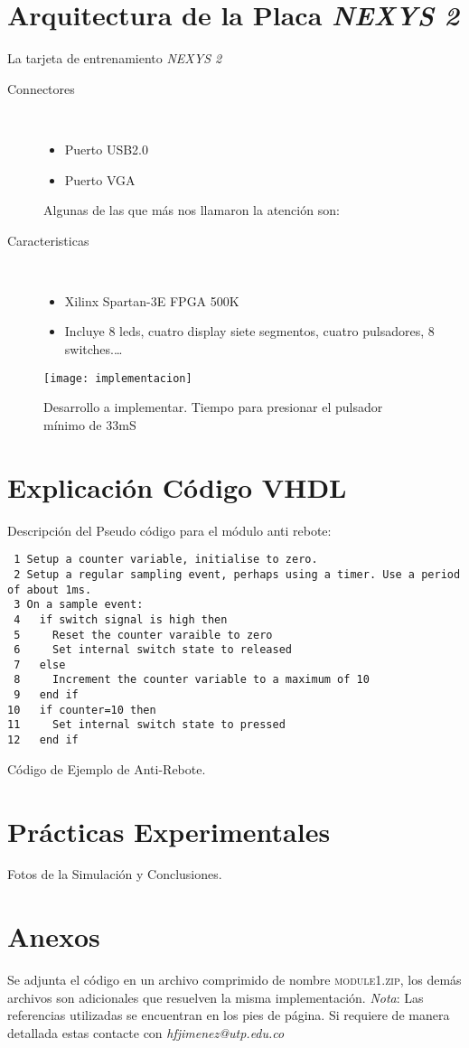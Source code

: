 \documentclass[paper=a4, fontsize=12pt]{article} 		%
\numberwithin{equation}{section}						%
\numberwithin{table}{section} 							%
\begin{document}
\section{Arquitectura de la Placa \emph{NEXYS 2}}
La tarjeta de entrenamiento \emph{NEXYS 2} 
\begin{description}
  \item[Connectores] \hfill \\
  	\begin{itemize}
		\item Puerto USB2.0
	    \item Puerto VGA
    \end{itemize}

Algunas de las que más nos llamaron la atención son:\\
  \item[Caracteristicas] \hfill \\
    	\begin{itemize}
			\item Xilinx Spartan-3E FPGA 500K
  			\item Incluye  8 leds, cuatro display siete segmentos, cuatro pulsadores, 8 switches.\ldots
      \end{itemize}
\end{description}
\begin{figure}[H]
  \centering
     \texttt{[image: implementacion]}
  \caption{Desarrollo a implementar. Tiempo para presionar el pulsador mínimo de 33mS}
  \label{fig:eliteimplemetacion}
\end{figure}
\section{Explicación Código VHDL}
Descripción del Pseudo código para el módulo anti rebote:
\begin{verbatim}
 1 Setup a counter variable, initialise to zero.
 2 Setup a regular sampling event, perhaps using a timer. Use a period of about 1ms.
 3 On a sample event:
 4   if switch signal is high then
 5     Reset the counter varaible to zero
 6     Set internal switch state to released
 7   else
 8     Increment the counter variable to a maximum of 10
 9   end if
10   if counter=10 then
11     Set internal switch state to pressed
12   end if
\end{verbatim}
Código de Ejemplo de Anti-Rebote.
\section{Prácticas Experimentales}
Fotos de la Simulación y Conclusiones.
\section{Anexos}
Se adjunta el código en un archivo comprimido de nombre \textsc{module1.zip}, los demás archivos son adicionales que resuelven la misma implementación.
\textit{Nota}: Las referencias utilizadas se encuentran en los pies de página. Si requiere de manera detallada estas contacte con \emph{hfjimenez@utp.edu.co}
\end{document}
